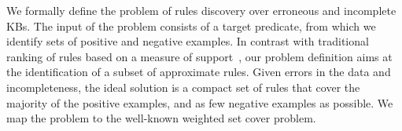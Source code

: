 \vspace{1ex}
We formally define the problem of rules discovery over erroneous and incomplete KBs. The input of the problem consists of a target predicate, from which we identify sets of positive and negative examples.  In contrast with traditional ranking of rules based on a measure of support~\cite{dehaspe1999discovery,galarraga2015fast,muggleton1995inverse,schoenmackers2010learning}, our  problem definition aims at the identification of a subset of approximate rules. %
Given errors in the data and incompleteness, the ideal solution is a compact set of rules that cover the majority of the positive examples, and as few negative examples as possible. We map the problem to the well-known weighted set cover problem.




